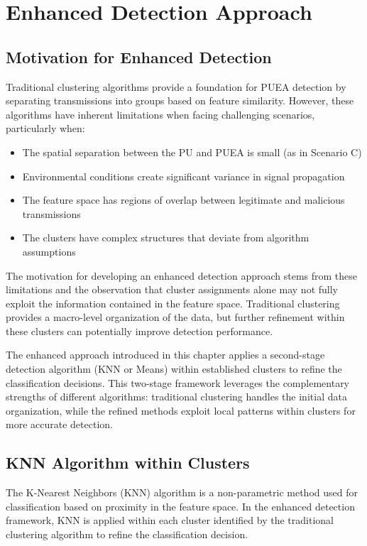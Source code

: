 \chapter{Enhanced Detection Approach}

\section{Motivation for Enhanced Detection}

Traditional clustering algorithms provide a foundation for PUEA detection by separating transmissions into groups based on feature similarity. However, these algorithms have inherent limitations when facing challenging scenarios, particularly when:

\begin{itemize}
    \item The spatial separation between the PU and PUEA is small (as in Scenario C)
    \item Environmental conditions create significant variance in signal propagation
    \item The feature space has regions of overlap between legitimate and malicious transmissions
    \item The clusters have complex structures that deviate from algorithm assumptions
\end{itemize}

The motivation for developing an enhanced detection approach stems from these limitations and the observation that cluster assignments alone may not fully exploit the information contained in the feature space. Traditional clustering provides a macro-level organization of the data, but further refinement within these clusters can potentially improve detection performance.

The enhanced approach introduced in this chapter applies a second-stage detection algorithm (KNN or Means) within established clusters to refine the classification decisions. This two-stage framework leverages the complementary strengths of different algorithms: traditional clustering handles the initial data organization, while the refined methods exploit local patterns within clusters for more accurate detection.

\section{KNN Algorithm within Clusters}

The K-Nearest Neighbors (KNN) algorithm is a non-parametric method used for classification based on proximity in the feature space. In the enhanced detection framework, KNN is applied within each cluster identified by the traditional clustering algorithm to refine the classification decision.

